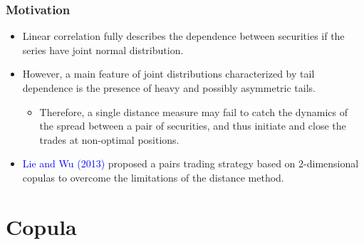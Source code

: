 \documentclass[pdf,9pt,xcolor=dvipsnames,hide notes]{beamer}
\begin{document}
	\begin{frame}[label=frame1c]
		\frametitle{Motivation}
		
		\begin{itemize}
			\justifying
			
			\item Linear correlation fully describes the dependence between securities if the series have joint normal distribution. 
			
			\vspace{0.3cm}
			
			\item   However, a main feature of joint distributions characterized by tail dependence is the presence of heavy and possibly asymmetric tails. 
			
			\begin{itemize}
				\item Therefore, a single distance measure may fail to catch the dynamics of the spread between a pair of securities, and thus initiate and close the trades at non-optimal positions.
			\end{itemize}
			
			\vspace{0.3cm}
			
			\item \textcolor{blue}{Lie and Wu} \textcolor{blue}{(2013)} proposed a pairs trading strategy based on 2-dimensional copulas to overcome the limitations of the distance method.
			
			\vspace{0.3cm}
			
		
		\end{itemize}
	\end{frame}

\section{Copula}
	
\end{document}
